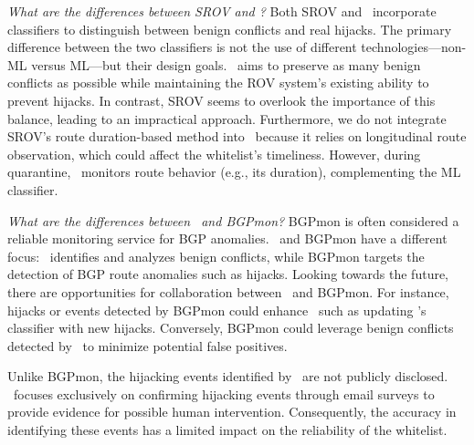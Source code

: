 \textit{What are the differences between SROV and \lov?}
Both SROV and \lov\ incorporate classifiers to distinguish between benign conflicts and real hijacks. The primary difference between the two classifiers is not the use of different technologies—non-ML versus ML—but their design goals. \lov\ aims to preserve as many benign conflicts as possible while maintaining the ROV system's existing ability to prevent hijacks. In contrast, SROV seems to overlook the importance of this balance, leading to an impractical approach. Furthermore, we do not integrate SROV's route duration-based method into \lov\ because it relies on longitudinal route observation, which could affect the whitelist's timeliness. However, during quarantine, \lov\ monitors route behavior (e.g., its duration), complementing the ML classifier.

\textit{What are the differences between \lov\ and BGPmon?}
BGPmon is often considered a reliable monitoring service for BGP anomalies.
\lov\ and BGPmon have a different focus: \lov\ identifies and analyzes benign conflicts, while BGPmon targets the detection of BGP route anomalies such as hijacks. Looking towards the future, there are opportunities for collaboration between \lov\ and BGPmon. For instance, hijacks or events detected by BGPmon could enhance \lov\, such as updating \lov's classifier with new hijacks. Conversely, BGPmon could leverage benign conflicts detected by \lov\ to minimize potential false positives.

Unlike BGPmon, the hijacking events identified by \lov\ are not publicly disclosed. \lov\ focuses exclusively on confirming hijacking events through email surveys to provide evidence for possible human intervention. Consequently, the accuracy in identifying these events has a limited impact on the reliability of the whitelist.


